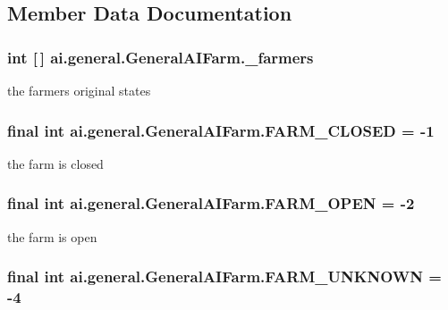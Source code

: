 \subsection{Member Data Documentation}
\hypertarget{classai_1_1general_1_1_general_a_i_farm_a4bdcfb5af83a86be179a4c10b9a8a597}{
\subsubsection[{\_\-farmers}]{\setlength{\rightskip}{0pt plus 5cm}int \mbox{[}$\,$\mbox{]} {\bf ai.general.GeneralAIFarm.\_\-farmers}}}
\label{classai_1_1general_1_1_general_a_i_farm_a4bdcfb5af83a86be179a4c10b9a8a597}
the farmers original states \hypertarget{classai_1_1general_1_1_general_a_i_farm_ae53454364afab495bdbc9870b54b7e4e}{
\subsubsection[{FARM\_\-CLOSED}]{\setlength{\rightskip}{0pt plus 5cm}final int {\bf ai.general.GeneralAIFarm.FARM\_\-CLOSED} = -\/1}}
\label{classai_1_1general_1_1_general_a_i_farm_ae53454364afab495bdbc9870b54b7e4e}
the farm is closed \hypertarget{classai_1_1general_1_1_general_a_i_farm_a7b7770da22903858892e7f63d32a6657}{
\subsubsection[{FARM\_\-OPEN}]{\setlength{\rightskip}{0pt plus 5cm}final int {\bf ai.general.GeneralAIFarm.FARM\_\-OPEN} = -\/2}}
\label{classai_1_1general_1_1_general_a_i_farm_a7b7770da22903858892e7f63d32a6657}
the farm is open \hypertarget{classai_1_1general_1_1_general_a_i_farm_aed2adecb0cce6a9a2fa0806c8fa11af5}{
\subsubsection[{FARM\_\-UNKNOWN}]{\setlength{\rightskip}{0pt plus 5cm}final int {\bf ai.general.GeneralAIFarm.FARM\_\-UNKNOWN} = -\/4}}
